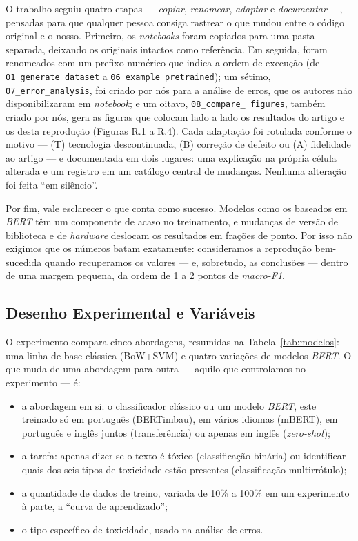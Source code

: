 \documentclass[sigconf, nonacm]{acmart}
\begin{document}
O trabalho seguiu quatro etapas --- \emph{copiar}, \emph{renomear},
\emph{adaptar} e \emph{documentar} ---, pensadas para que qualquer pessoa
consiga rastrear o que mudou entre o código original e o nosso. Primeiro,
os \emph{notebooks} foram copiados para uma pasta separada,
deixando os originais intactos como referência. Em seguida, foram
renomeados com um prefixo numérico que indica a ordem de execução
(de \texttt{01\_\allowbreak generate\_\allowbreak dataset} a
\texttt{06\_\allowbreak example\_\allowbreak pretrained}); um sétimo,
\texttt{07\_\allowbreak error\_\allowbreak analysis}, foi criado por nós
para a análise de erros, que os autores não disponibilizaram em
\emph{notebook}; e um oitavo, \texttt{08\_\allowbreak compare\_\allowbreak
figures}, também criado por nós, gera as figuras que colocam lado a lado
os resultados do artigo e os desta reprodução (Figuras R.1 a R.4). Cada adaptação foi rotulada conforme o motivo ---
(T) tecnologia descontinuada, (B) correção de defeito ou
(A) fidelidade ao artigo --- e documentada em dois
lugares: uma explicação na própria célula alterada e um registro em um
catálogo central de mudanças. Nenhuma alteração foi feita ``em silêncio''.
 
Por fim, vale esclarecer o que conta como sucesso. Modelos como os
baseados em \emph{BERT} têm um componente de acaso no treinamento, e
mudanças de versão de biblioteca e de \emph{hardware} deslocam os
resultados em frações de ponto. Por isso não exigimos que os números batam
exatamente: consideramos a reprodução bem-sucedida quando recuperamos os
valores --- e, sobretudo, as conclusões --- dentro de uma margem pequena,
da ordem de 1 a 2 pontos de \emph{macro-F1}.
 
\subsection{Desenho Experimental e Variáveis}
\label{sec:desenho}
 
O experimento compara cinco abordagens, resumidas na
Tabela~\ref{tab:modelos}: uma linha de base clássica (BoW+SVM) e quatro
variações de modelos \emph{BERT}. O que muda de uma abordagem para outra
--- aquilo que controlamos no experimento --- é:
 
\begin{itemize}
  \item a abordagem em si: o classificador clássico ou um modelo
        \emph{BERT}, este treinado só em português (BERTimbau), em vários
        idiomas (mBERT), em português e inglês juntos (transferência) ou
        apenas em inglês (\emph{zero-shot});
  \item a tarefa: apenas dizer se o texto é tóxico (classificação
        binária) ou identificar quais dos seis tipos de toxicidade estão
        presentes (classificação multirrótulo);
  \item a quantidade de dados de treino, variada de 10\% a 100\%
        em um experimento à parte, a ``curva de aprendizado'';
  \item o tipo específico de toxicidade, usado na análise de
        erros.
\end{itemize}
 
\end{document}

